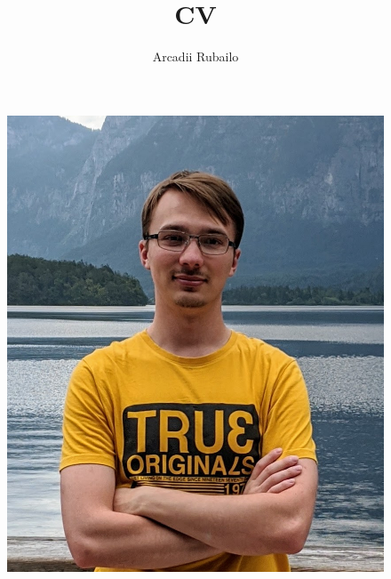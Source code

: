 \documentclass[12pt, a4paper]{article}
\title{CV}
\author{Arcadii Rubailo}
\begin{document}
\begin{minipage}[t]{0.35\textwidth}
    \begin{figure}[H]
        \vspace*{-12pt}
        \includegraphics[width=\textwidth]{profile}
    \end{figure}
    
    \begin{center}
    \end{center}
    

\end{minipage}
\end{document}
